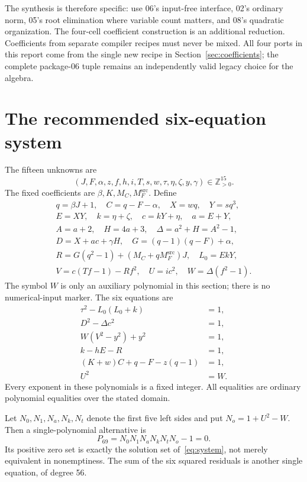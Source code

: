 \documentclass[11pt,a4paper]{article}
\theoremstyle{remark}\newtheorem{remark}[theorem]{Remark}
\newcommand{\Pos}{\mathbb Z_{>0}}
\newcommand{\Msrc}{M_F^{\mathrm{src}}}
\begin{document}
The synthesis is therefore specific: use 06's input-free interface,
02's ordinary norm, 05's root elimination where variable count matters,
and 08's quadratic organization. The four-cell coefficient construction
is an additional reduction. Coefficients from separate compiler recipes
must never be mixed. All four ports in this report come from the single
new recipe in Section~\ref{sec:coefficients}; the complete package-06
tuple remains an independently valid legacy choice for the algebra.

\section{The recommended six-equation system}\label{sec:system}
The fifteen unknowns are
\[
 (J,F,\alpha,z,f,h,i,T,s,w,\tau,\eta,\zeta,y,\gamma)\in\Pos^{15}.
\]
The fixed coefficients are \(\beta,K,M_C,\Msrc\). Define
\begin{equation}
\begin{gathered}
 q=\beta J+1,\quad C=q-F-\alpha,\quad X=wq,\quad Y=sq^3,\\
 E=XY,\quad k=\eta+\zeta,\quad c=kY+\eta,\quad a=E+Y,\\
 A=a+2,\quad H=4a+3,\quad \Delta=a^2+H=A^2-1,\\
 D=X+ac+\gamma H,\quad G=(q-1)(q-F)+\alpha,\\
 R=G(q^2-1)+(M_C+q\Msrc)J,\quad L_0=EkY,\\
 V=c(Tf-1)-Rf^2,\quad U=ic^2,\quad W=\Delta(f^2-1).
\end{gathered}
\label{eq:definitions}
\end{equation}
The symbol \(W\) is only an auxiliary polynomial in this section; there
is no numerical-input marker. The six equations are
\begin{equation}
\boxed{\begin{aligned}
 \tau^2-L_0(L_0+k)&=1,\\
 D^2-\Delta c^2&=1,\\
 W(V^2-y^2)+y^2&=1,\\
 k-hE-R&=1,\\
 (K+w)C+q-F-z(q-1)&=1,\\
 U^2&=W.
\end{aligned}}\label{eq:system}
\end{equation}
Every exponent in these polynomials is a fixed integer. All equalities
are ordinary polynomial equalities over the stated domain.

Let \(N_0,N_1,N_a,N_k,N_t\) denote the first five left sides and put
\(N_o=1+U^2-W\). Then a single-polynomial alternative is
\begin{equation}
 \boxed{P_{69}=N_0N_1N_aN_kN_tN_o-1=0.}\label{eq:p69}
\end{equation}
Its positive zero set is exactly the solution set of~\eqref{eq:system},
not merely equivalent in nonemptiness. The sum of the six squared
residuals is another single equation, of degree 56.
\end{document}
